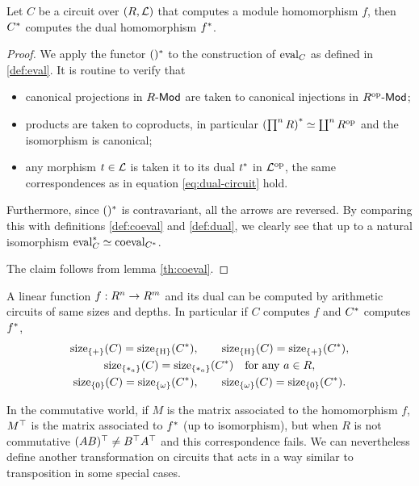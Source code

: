 \begin{theorem}
  \label{th:tellegen}
  Let $C$ be a circuit over $(R,\mathcal{L})$ that computes a module
  homomorphism $f$, then $C^\ast$ computes the dual homomorphism
  $f^\ast$.
\end{theorem}
\begin{proof}
  We apply the functor $()^\ast$ to the construction of $\operatorname{eval}_C$ as
  defined in \ref{def:eval}. It is routine to verify that
  \begin{itemize}
  \item canonical projections in $R\text{\sf-Mod}$ are taken to canonical
    injections in $R^{\mathrm{op}}\text{\sf-Mod}$;
  \item products are taken to coproducts, in particular
    $\left(\prod^n R\right)^\ast \simeq \coprod^nR^{\mathrm{op}}$ and the isomorphism is canonical;
  \item any morphism $t\in\mathcal{L}$ is taken it to its dual $t^\ast$
    in $\mathcal{L}^{\mathrm{op}}$, the same correspondences as in equation
    \eqref{eq:dual-circuit} hold.
  \end{itemize}
  Furthermore, since $()^\ast$ is contravariant, all the arrows are
  reversed. By comparing this with definitions \ref{def:coeval} and
  \ref{def:dual}, we clearly see that up to a natural isomorphism
  $\operatorname{eval}_C^\ast\simeq\operatorname{coeval}_{C^\ast}$.

  The claim follows from lemma \ref{th:coeval}.
\end{proof}

\begin{corollary}
  A linear function $f:R^n\rightarrow R^m$ and its dual can be computed by
  arithmetic circuits of same sizes and depths. In particular if $C$
  computes $f$ and $C^\ast$ computes $f^\ast$,
  \begin{gather*}
    \operatorname{size}_{\{+\}}(C) = \operatorname{size}_{\{\operatorname{H}\}}(C^\ast), \qquad  
    \operatorname{size}_{\{\operatorname{H}\}}(C) = \operatorname{size}_{\{+\}}(C^\ast), \\
    \operatorname{size}_{\{*_{a}\}}(C) = \operatorname{size}_{\{*_{a}\}}(C^\ast)\quad\text{for any $a\in R$},\\
    \operatorname{size}_{\{0\}}(C) = \operatorname{size}_{\{\omega\}}(C^\ast), \qquad 
    \operatorname{size}_{\{\omega\}}(C) = \operatorname{size}_{\{0\}}(C^\ast).
  \end{gather*}
\end{corollary}

In the commutative world, if $M$ is the matrix associated to the
homomorphism $f$, $M^\top$ is the matrix associated to $f^\ast$
(up to isomorphism), but when $R$ is not commutative
$(AB)^\top\ne B^\top A^\top$ and this correspondence fails. We
can nevertheless define another transformation on circuits that acts
in a way similar to transposition in some special cases.

